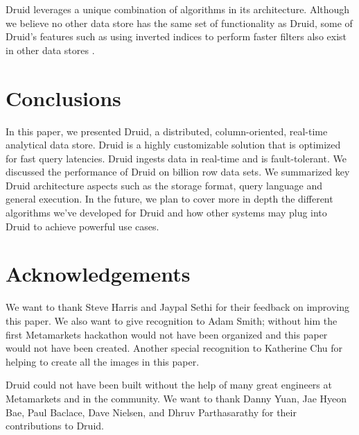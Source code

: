 \documentclass{vldb}
\begin{document}
Druid leverages a unique combination of algorithms in its
architecture. Although we believe no other data store has the same set
of functionality as Druid, some of Druid’s features such as using
inverted indices to perform faster filters also exist in other data
stores \cite{macnicol2004sybase}.

\section{Conclusions}
\label{sec:conclusions}
In this paper, we presented Druid, a distributed, column-oriented,
real-time analytical data store. Druid is a highly customizable
solution that is optimized for fast query latencies. Druid ingests
data in real-time and is fault-tolerant. We discussed the performance
of Druid on billion row data sets. We summarized key Druid architecture
aspects such as the storage format, query language and general
execution. In the future, we plan to cover more in depth the different
algorithms we’ve developed for Druid and how other systems may plug
into Druid to achieve powerful use cases.

\balance

\section{Acknowledgements}
\label{sec:acknowledgements}
We want to thank Steve Harris and Jaypal Sethi for their feedback on improving this paper.
We also want to give recognition to Adam Smith; without him the first Metamarkets hackathon would not have
been organized and this paper would not have been created. Another special recognition to Katherine Chu for
helping to create all the images in this paper.

Druid could not have been built without the help of many great
engineers at Metamarkets and in the community. We want to thank Danny Yuan, Jae Hyeon Bae, Paul Baclace, Dave
Nielsen, and Dhruv Parthasarathy for their
contributions to Druid.




\end{document}
